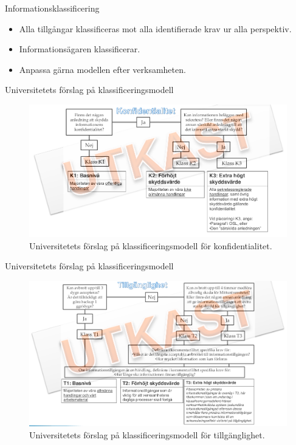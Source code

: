 \documentclass{beamer}
\begin{document}
\begin{frame}{Informationsklassificering}
  \begin{itemize}
    \item Alla tillgångar klassificeras mot alla identifierade krav ur alla 
      perspektiv.
    \item Informationsägaren klassificerar.
    \item Anpassa gärna modellen efter verksamheten.
  \end{itemize}
\end{frame}

\begin{frame}{Universitetets förslag på klassificeringsmodell}
  \begin{figure}
    \includegraphics[width=\textwidth]{miun-klassificering.png}
    \caption{Universitetets förslag på klassificeringsmodell för 
    konfidentialitet.}
  \end{figure}
\end{frame}

\begin{frame}{Universitetets förslag på klassificeringsmodell}
  \begin{figure}
    \includegraphics[width=\textwidth]{miun-tillganglighet.png}
    \caption{Universitetets förslag på klassificeringsmodell för 
    tillgänglighet.}
  \end{figure}
\end{frame}
\end{document}
